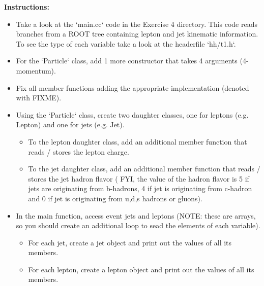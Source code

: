 \documentclass{article}
\newcounter{exercise}
\newenvironment{exr}[1]{%
    \refstepcounter{exercise}
    \begin{tcolorbox}[colback=blue!5!white, colframe=blue!75!black, title=Exercise \theexercise]
    \textbf{Instructions:} #1
    \end{tcolorbox}
    \vspace{1em}
}{}
\begin{document}
\begin{exr}{
    \begin{itemize}
        \item Take a look at the `main.cc` code in the Exercise 4 directory. This code reads branches from a ROOT tree containing lepton and jet kinematic information. To see the type of each variable take a look at the headerfile `hh/t1.h`.
        \item For the `Particle` class, add 1 more constructor that takes 4 arguments (4-momentum).
        \item Fix all member functions adding the appropriate implementation (denoted with FIXME).
        \item Using the `Particle` class, create two daughter classes, one for leptons (e.g. Lepton) and one for jets (e.g. Jet).
        \begin{itemize}
            \item To the lepton daughter class, add an additional member function that reads / stores the lepton charge.
            \item To the jet daughter class, add an additional member function that reads / stores the jet hadron flavor ( FYI, the value of the hadron flavor is 5 if jets are originating from b-hadrons, 4 if jet is originating from c-hadron and 0 if jet is originating from u,d,s hadrons or gluons).
        \end{itemize}
        \item In the main function, access event jets and leptons (NOTE: these are arrays, so you should create an additional loop to sead the elements of each variable).
        \begin{itemize}
            \item For each jet, create a jet object and print out the values of all its members.
            \item For each lepton, create a lepton object and print out the values of all its members.
        \end{itemize}
    \end{itemize}
    }
\end{exr}


\end{document}

